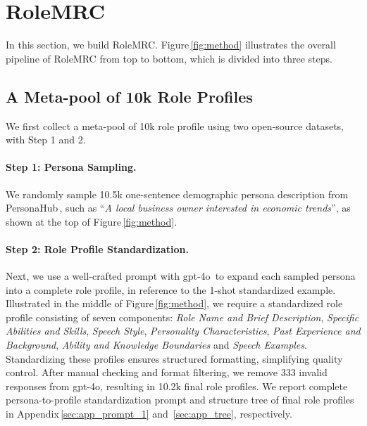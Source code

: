 \section{RoleMRC}
\label{sec:method}

In this section, we build RoleMRC. Figure\,\ref{fig:method} illustrates the overall pipeline of RoleMRC from top to bottom, which is divided into three steps.

\subsection{A Meta-pool of 10k Role Profiles}
\label{sec:meta_pool}
We first collect a meta-pool of 10k role profile using two open-source datasets, with Step 1 and 2.

\paragraph{Step 1: Persona Sampling.} We randomly sample 10.5k one-sentence demographic persona description from PersonaHub\,\cite{ge2024scaling}, such as ``\emph{A local business owner interested in economic trends}'', as shown at the top of Figure\,\ref{fig:method}. 

\paragraph{Step 2: Role Profile Standardization.} Next, we use a well-crafted prompt with gpt-4o\,\cite{gpt4o} to expand each sampled persona into a complete role profile, in reference to the 1-shot standardized example. Illustrated in the middle of Figure\,\ref{fig:method}, we require a standardized role profile consisting of seven components: \emph{Role Name and Brief Description}, \emph{Specific Abilities and Skills}, \emph{Speech Style}, \emph{Personality Characteristics}, \emph{Past Experience and Background}, \emph{Ability and Knowledge Boundaries} and \emph{Speech Examples}. %
Standardizing these profiles ensures structured formatting, simplifying quality control. 
After manual checking and format filtering, we remove 333 invalid responses from gpt-4o, resulting in 10.2k final role profiles. We report complete persona-to-profile standardization prompt and structure tree of final role profiles in Appendix\,\ref{sec:app_prompt_1} and \,\ref{sec:app_tree}, respectively.

